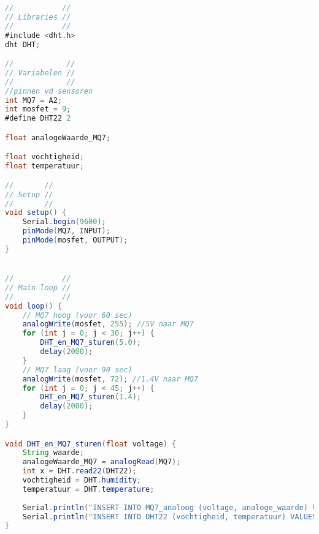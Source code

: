 \begin{lstlisting}[language=Java,caption={Warmte-koelcyclus van de MQ7}]
//           //
// Libraries //
//           //
#include <dht.h>
dht DHT;

//            //
// Variabelen //
//            //
//pinnen vd sensoren 
int MQ7 = A2;
int mosfet = 9;
#define DHT22 2

float analogeWaarde_MQ7;

float vochtigheid;
float temperatuur;

//       //
// Setup //
//       //
void setup() {
    Serial.begin(9600);
    pinMode(MQ7, INPUT);
    pinMode(mosfet, OUTPUT);
}


//           //
// Main loop //
//           //
void loop() {
    // MQ7 hoog (voor 60 sec)
    analogWrite(mosfet, 255); //5V naar MQ7
    for (int j = 0; j < 30; j++) {
        DHT_en_MQ7_sturen(5.0);
        delay(2000);
    }
    // MQ7 laag (voor 90 sec)
    analogWrite(mosfet, 72); //1.4V naar MQ7
    for (int j = 0; j < 45; j++) {
        DHT_en_MQ7_sturen(1.4);
        delay(2000);
    }
}

void DHT_en_MQ7_sturen(float voltage) {
    String waarde;
    analogeWaarde_MQ7 = analogRead(MQ7);
    int x = DHT.read22(DHT22);
    vochtigheid = DHT.humidity;
    temperatuur = DHT.temperature;
    
    Serial.println("INSERT INTO MQ7_analoog (voltage, analoge_waarde) VALUES ("+String(voltage)+", "+String(analogeWaarde_MQ7)+");");
    Serial.println("INSERT INTO DHT22 (vochtigheid, temperatuur) VALUES ("+String(vochtigheid)+", "+String(temperatuur)+");");
}

\end{lstlisting}








